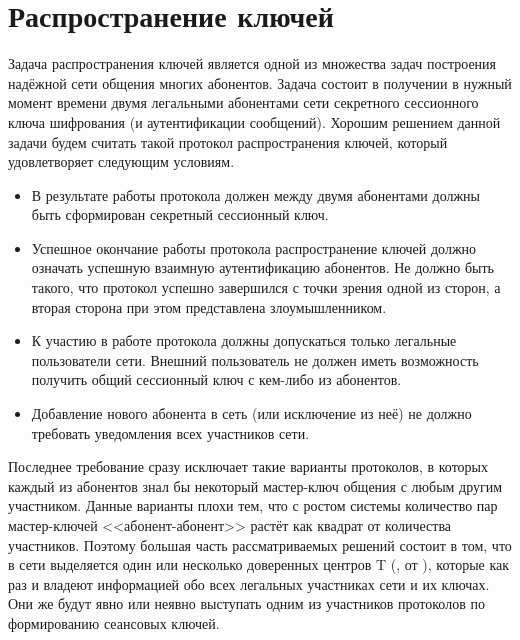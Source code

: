 \chapter{Распространение ключей}\label{chapter-key-distribution-protocols}

Задача распространения ключей является одной из множества задач построения надёжной сети общения многих абонентов. Задача состоит в получении в нужный момент времени двумя легальными абонентами сети секретного сессионного ключа шифрования (и аутентификации сообщений). Хорошим решением данной задачи будем считать такой протокол распространения ключей, который удовлетворяет следующим условиям.

\begin{itemize}
	\item В результате работы протокола должен между двумя абонентами должны быть сформирован секретный сессионный ключ.
	\item Успешное окончание работы протокола распространение ключей должно означать успешную взаимную аутентификацию абонентов. Не должно быть такого, что протокол успешно завершился с точки зрения одной из сторон, а вторая сторона при этом представлена злоумышленником.
	\item К участию в работе протокола должны допускаться только легальные пользователи сети. Внешний пользователь не должен иметь возможность получить общий сессионный ключ с кем-либо из абонентов.
	\item Добавление нового абонента в сеть (или исключение из неё) не должно требовать уведомления всех участников сети.
\end{itemize}

Последнее требование сразу исключает такие варианты протоколов, в которых каждый из абонентов знал бы некоторый мастер-ключ общения с любым другим участником. Данные варианты плохи тем, что с ростом системы количество пар мастер-ключей <<абонент-абонент>> растёт как квадрат от количества участников. Поэтому большая часть рассматриваемых решений состоит в том, что в сети выделяется один или несколько доверенных центров T (, от ), которые как раз и владеют информацией обо всех легальных участниках сети и их ключах. Они же будут явно или неявно выступать одним из участников протоколов по формированию сеансовых ключей.

